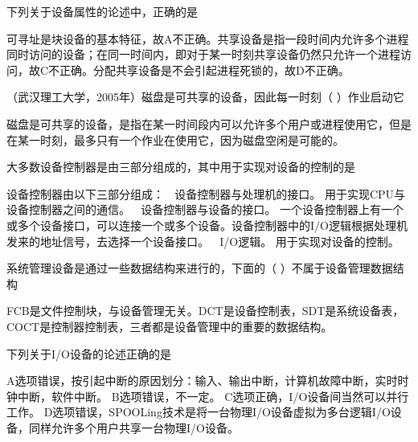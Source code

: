 \question 下列关于设备属性的论述中，正确的是
\par{}
\begin{solution}可寻址是块设备的基本特征，故A不正确。共享设备是指一段时间内允许多个进程同时访问的设备；在同一时间内，即对于某一时刻共享设备仍然只允许一个进程访问，故C不正确。分配共享设备是不会引起进程死锁的，故D不正确。
\end{solution}
\question （武汉理工大学，2005年）磁盘是可共享的设备，因此每一时刻（ ）作业启动它
\par{}
\begin{solution}磁盘是可共享的设备，是指在某一时间段内可以允许多个用户或进程使用它，但是在某一时刻，最多只有一个作业在使用它，因为磁盘空闲是可能的。
\end{solution}
\question 大多数设备控制器是由三部分组成的，其中用于实现对设备的控制的是
\par{}
\begin{solution}设备控制器由以下三部分组成：  设备控制器与处理机的接口。
用于实现CPU与设备控制器之间的通信。  设备控制器与设备的接口。
一个设备控制器上有一个或多个设备接口，可以连接一个或多个设备。设备控制器中的I/O逻辑根据处理机发来的地址信号，去选择一个设备接口。
 I/O逻辑。 用于实现对设备的控制。
\end{solution}
\question 系统管理设备是通过一些数据结构来进行的，下面的（
）不属于设备管理数据结构
\par{}
\begin{solution}FCB是文件控制块，与设备管理无关。DCT是设备控制表，SDT是系统设备表，COCT是控制器控制表，三者都是设备管理中的重要的数据结构。
\end{solution}
\question 下列关于I/O设备的论述正确的是
\par{}
\begin{solution}A选项错误，按引起中断的原因划分：输入、输出中断，计算机故障中断，实时时钟中断，软件中断。
B选项错误，不一定。 C选项正确，I/O设备间当然可以并行工作。
D选项错误，SPOOLing技术是将一台物理I/O设备虚拟为多台逻辑I/O设备，同样允许多个用户共享一台物理I/O设备。
\end{solution}
